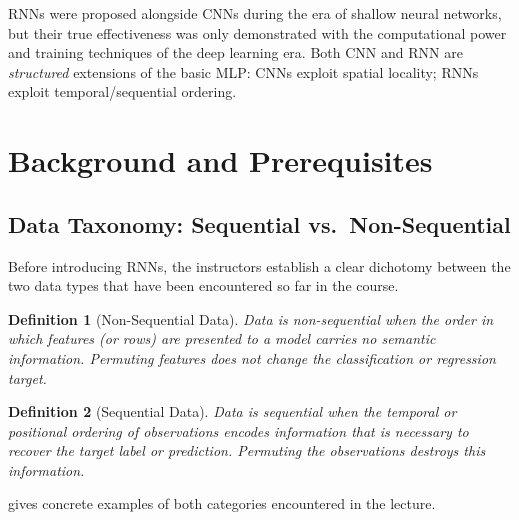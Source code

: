 \documentclass[12pt,a4paper]{article}
\newtheorem{definition}{Definition}[section]
\begin{document}
\begin{keyinsight}
RNNs were proposed alongside CNNs during the era of shallow neural networks,
but their true effectiveness was only demonstrated with the computational
power and training techniques of the deep learning era.  Both CNN and RNN
are \emph{structured} extensions of the basic MLP: CNNs exploit spatial
locality; RNNs exploit temporal/sequential ordering.
\end{keyinsight}

\section{Background and Prerequisites}
\label{sec:background}

\subsection{Data Taxonomy: Sequential vs.\ Non-Sequential}
\label{subsec:data_taxonomy}

Before introducing RNNs, the instructors establish a clear dichotomy between
the two data types that have been encountered so far in the course.

\begin{definition}[Non-Sequential Data]
\label{def:nonseq}
Data is \emph{non-sequential} when the order in which features (or rows) are
presented to a model carries no semantic information.  Permuting features
does not change the classification or regression target.
\end{definition}

\begin{definition}[Sequential Data]
\label{def:seq}
Data is \emph{sequential} when the temporal or positional ordering of
observations encodes information that is necessary to recover the target
label or prediction.  Permuting the observations destroys this information.
\end{definition}

 gives concrete examples of both categories encountered
in the lecture.
\end{document}
